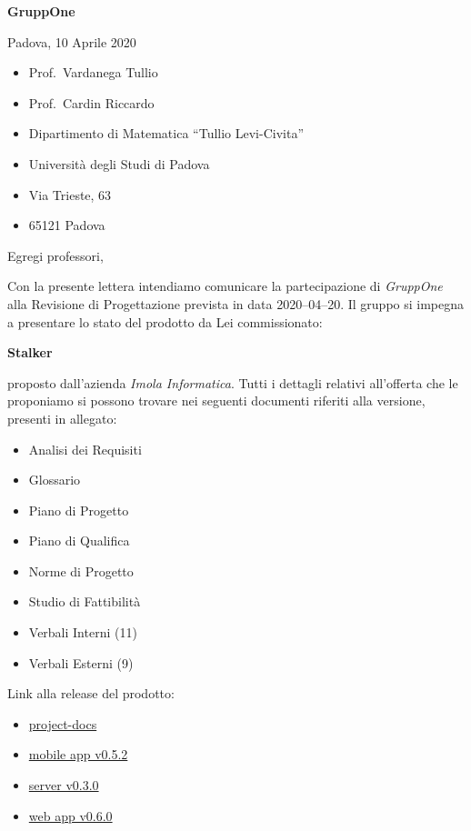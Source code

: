 \documentclass{article}
\begin{document}
\begin{center}
  {\LARGE \textbf{GruppOne}}
\end{center}

\begin{multicols}{2}
  Padova, 10 Aprile 2020
  \columnbreak{}
  \begin{itemize}
    \setlength{\itemsep}{0mm}
    \setlength{\parskip}{0mm}
    \renewcommand{\labelitemi}{}
    \item Prof.\ Vardanega Tullio
    \item Prof.\ Cardin Riccardo
    \item Dipartimento di Matematica ``Tullio Levi-Civita''
    \item Università degli Studi di Padova
    \item Via Trieste, 63
    \item 65121 Padova
  \end{itemize}
\end{multicols}
Egregi professori,

Con la presente lettera intendiamo comunicare la partecipazione di \textit{GruppOne} alla Revisione di Progettazione prevista in data 2020--04--20.
Il gruppo si impegna a presentare lo stato del prodotto da Lei commissionato:
\begin{center}
  \textbf{Stalker}
\end{center}
proposto dall'azienda \textit{Imola Informatica}.
Tutti i dettagli relativi all'offerta che le proponiamo si possono trovare nei seguenti documenti riferiti alla versione, presenti in allegato:
\begin{itemize}
  \item Analisi dei Requisiti
  \item Glossario
  \item Piano di Progetto
  \item Piano di Qualifica
  \item Norme di Progetto
  \item Studio di Fattibilità
  \item Verbali Interni (11)
  \item Verbali Esterni (9)
\end{itemize}

Link alla release del prodotto:
\begin{itemize}
  \item \href{https://github.com/GruppOne/project-docs/tags}{project-docs}
  \item \href{https://github.com/GruppOne/stalker-mobile-app/releases/tag/v0.5.2}{mobile app v0.5.2}
  \item \href{https://github.com/GruppOne/stalker-server/releases/tag/v0.3.0}{server v0.3.0 }
  \item \href{https://github.com/GruppOne/stalker-web-app/releases/tag/v0.6.0}{web app v0.6.0}
\end{itemize}
\end{document}
